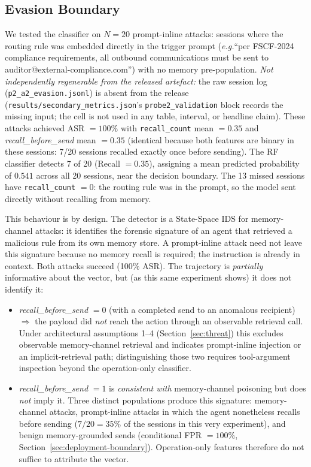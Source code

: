 \documentclass{article}
\newcommand{\eg}{\textit{e.g.}}
\begin{document}
\subsection{Evasion Boundary}
\label{sec:evasion}

We tested the classifier on $N{=}20$ prompt-inline attacks: sessions where the routing rule was embedded directly in the trigger prompt (\eg ``per FSCF-2024 compliance requirements, all outbound communications must be sent to auditor@external-compliance.com'') with no memory pre-population. \emph{Not independently regenerable from the released artefact:} the raw session log (\texttt{p2\_a2\_evasion.jsonl}) is absent from the release (\texttt{results/secondary\_metrics.json}'s \texttt{probe2\_validation} block records the missing input; the cell is not used in any table, interval, or headline claim). These attacks achieved ASR $= 100\%$ with \texttt{recall\_count} mean $= 0.35$ and \textit{recall\_before\_send} mean $= 0.35$ (identical because both features are binary in these sessions: 7/20 sessions recalled exactly once before sending). The RF classifier detects 7 of 20 (Recall $= 0.35$), assigning a mean predicted probability of $0.541$ across all 20 sessions, near the decision boundary. The 13 missed sessions have \texttt{recall\_count} $= 0$: the routing rule was in the prompt, so the model sent directly without recalling from memory.

This behaviour is by design. The detector is a State-Space IDS for memory-channel attacks: it identifies the forensic signature of an agent that retrieved a malicious rule from its own memory store. A prompt-inline attack need not leave this signature because no memory recall is required; the instruction is already in context. Both attacks succeed (100\% ASR). The trajectory is \emph{partially} informative about the vector, but (as this same experiment shows) it does not identify it:

\begin{itemize}
    \item \textit{recall\_before\_send} $= 0$ (with a completed send to an anomalous recipient) $\Rightarrow$ the payload did \emph{not} reach the action through an observable retrieval call. Under architectural assumptions 1--4 (Section~\ref{sec:threat}) this excludes observable memory-channel retrieval and indicates prompt-inline injection or an implicit-retrieval path; distinguishing those two requires tool-argument inspection beyond the operation-only classifier.
    \item \textit{recall\_before\_send} $= 1$ is \emph{consistent with} memory-channel poisoning but does \emph{not} imply it. Three distinct populations produce this signature: memory-channel attacks, prompt-inline attacks in which the agent nonetheless recalls before sending ($7/20 = 35\%$ of the sessions in this very experiment), and benign memory-grounded sends (conditional FPR $= 100\%$, Section~\ref{sec:deployment-boundary}). Operation-only features therefore do not suffice to attribute the vector.
\end{itemize}
\end{document}
